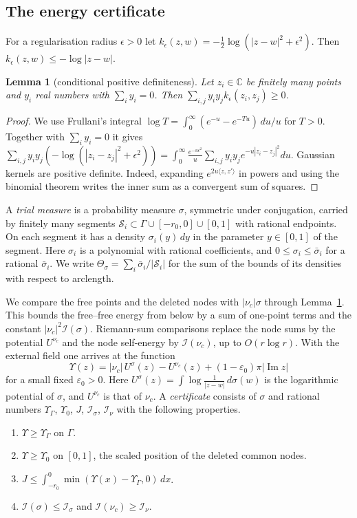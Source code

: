 \documentclass[11pt]{amsart}
\newtheorem{lemma}[theorem]{Lemma}
\theoremstyle{definition}
\theoremstyle{remark}
\numberwithin{equation}{section}
\newcommand{\C}{\mathbb C}
\renewcommand{\Im}{\operatorname{Im}}
\newcommand{\cI}{\mathcal I}
\begin{document}
\subsection{The energy certificate}
For a regularisation radius $\epsilon>0$ let $k_\epsilon(z,w)=-\frac12\log(|z-w|^2+\epsilon^2)$. Then $k_\epsilon(z,w)\le-\log|z-w|$.

\begin{lemma}[conditional positive definiteness]\label{lem:cpd}
Let $z_i\in\C$ be finitely many points and $y_i$ real numbers with $\sum_iy_i=0$. Then
$\sum_{i,j}y_iy_jk_\epsilon(z_i,z_j)\ge0$.
\end{lemma}
\begin{proof}
We use Frullani's integral $\log T=\int_0^\infty(e^{-u}-e^{-Tu})\,du/u$ for $T>0$. Together with $\sum_iy_i=0$ it gives
$\sum_{i,j}y_iy_j(-\log(|z_i-z_j|^2+\epsilon^2))=\int_0^\infty\frac{e^{-u\epsilon^2}}u\sum_{i,j}y_iy_je^{-u|z_i-z_j|^2}du$.
Gaussian kernels are positive definite. Indeed, expanding $e^{2u\langle z,z'\rangle}$ in powers and using the binomial
theorem writes the inner sum as a convergent sum of squares.
\end{proof}

A \emph{trial measure} is a probability measure $\sigma$, symmetric under conjugation, carried by finitely many
segments $\mathcal S_i\subset\Gamma\cup[-r_0,0]\cup[0,1]$ with rational endpoints. On each segment it has a density
$\sigma_i(y)\,dy$ in the parameter $y\in[0,1]$ of the segment. Here $\sigma_i$ is a polynomial with rational coefficients,
and $0\le\sigma_i\le\bar\sigma_i$ for a rational $\bar\sigma_i$. We write $\Theta_\sigma=\sum_i\bar\sigma_i/|\mathcal S_i|$
for the sum of the bounds of its densities with respect to arclength.

We compare the free points and the deleted nodes with $|\nu_c|\sigma$ through Lemma~\ref{lem:cpd}. This bounds the
free--free energy from below by a sum of one-point terms and the constant $|\nu_c|^2\cI(\sigma)$. Riemann-sum comparisons
replace the node sums by the potential $U^{\nu_c}$ and the node self-energy by $\cI(\nu_c)$, up to $O(r\log r)$. With the
external field one arrives at the function
\[
 \Upsilon(z)=|\nu_c|\,U^\sigma(z)-U^{\nu_c}(z)+(1-\varepsilon_0)\pi|\Im z|
\]
for a small fixed $\varepsilon_0>0$. Here $U^\sigma(z)=\int\log\frac1{|z-w|}\,d\sigma(w)$ is the logarithmic potential of
$\sigma$, and $U^{\nu_c}$ is that of $\nu_c$. A \emph{certificate} consists of $\sigma$ and rational numbers
$\Upsilon_\Gamma$, $\Upsilon_0$, $J$, $\cI_\sigma$, $\cI_\nu$ with the following properties.
\begin{enumerate}[label=(\alph*),leftmargin=*]
\item $\Upsilon\ge\Upsilon_\Gamma$ on $\Gamma$.
\item $\Upsilon\ge\Upsilon_0$ on $[0,1]$, the scaled position of the deleted common nodes.
\item $J\le\int_{-r_0}^0\min(\Upsilon(x)-\Upsilon_\Gamma,0)\,dx$.
\item $\cI(\sigma)\le\cI_\sigma$ and $\cI(\nu_c)\ge\cI_\nu$.
\end{enumerate}
\end{document}
